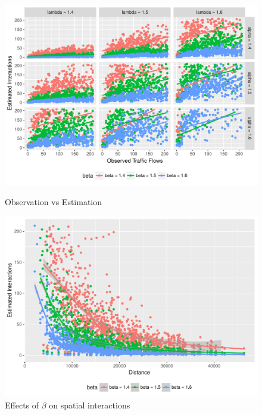 \documentclass[a4paper,reqno,]{article}
\begin{document}
\begin{enumerate}
\begin{figure}[H]
\centering
\begin{minipage}[b]{0.49\textwidth}
\centering
    \captionsetup{width=1\linewidth}
    \includegraphics[width=1\textwidth]{images/SIM/obs_est.pdf}
    \caption{Observation vs Estimation}\label{fig: obs_est}
\end{minipage}
\begin{minipage}[b]{0.49\textwidth}
\centering
    \captionsetup{width=1\linewidth}
    \includegraphics[width=1\textwidth]{images/SIM/dis_beta.pdf}
    \caption{Effects of $\beta$  on spatial interactions}\label{fig: dis_beta}
\end{minipage}
\end{figure} 


\end{enumerate}
\end{document}
